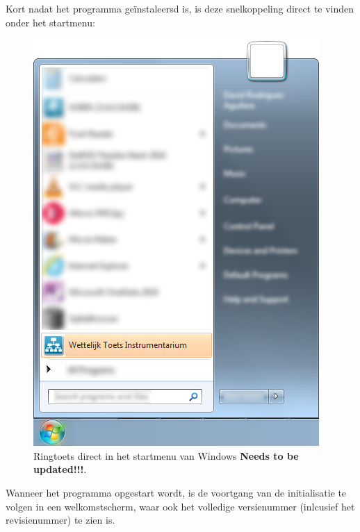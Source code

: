 Kort nadat het programma ge\"instaleersd is, is deze snelkoppeling direct te vinden onder het startmenu:

\begin{figure} [H]
	\centering
		\includegraphics{figures/chapter_installation/rtDirectlyinStartMenu}
	\caption{Ringtoets direct in het startmenu van Windows \color[rgb]{1,0,0} \textbf{Needs to be updated!!!}\color[rgb]{0,0,0}.}
	\label{fig:figinstall.3}
\end{figure}

Wanneer het programma opgestart wordt, is de voortgang van de initialisatie 
te volgen in een welkomstscherm, waar ook het volledige versienummer (inlcusief het revisienummer) te zien is.

